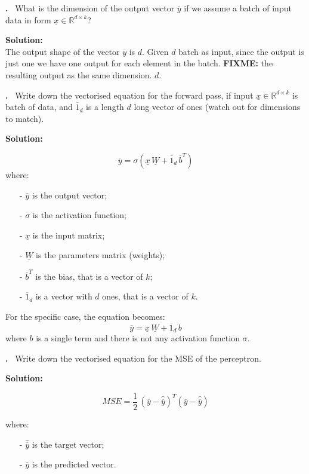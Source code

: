 \documentclass[a4paper,12pt]{article} %
\newcounter{problem}
\newcounter{solution}
\newcommand\Problem{%
	\stepcounter{problem}%
	\textbf{\theproblem.}~%
	\setcounter{solution}{0}%
}
\newcommand\Solution{%
	\textbf{Solution:}\\%
}
\begin{document}
	\Problem{What is the dimension of the output vector $\overline{y}$ if we 
	assume a batch of input data in form $\underline{x} \in \mathbb{R}^{d 
	\times k}$?}\medskip
	
	\Solution{The output shape of the vector $\overline{y}$ is $d$. Given $d$ 
	batch as input, since the output is just one we have one output for each 
	element in the batch. \textbf{FIXME:} the resulting output as the same 
	dimension.
	$d$.}\vspace{0.4cm}
	
	\Problem{Write down the vectorised equation for the forward pass, if input 
	$\underline{x} \in \mathbb{R}^{d \times k}$ is batch of data, and 
	$\overline{1}_d$ is a length $d$ long vector of ones (watch out for 
	dimensions to match).}\medskip
	
	\Solution{
		\begin{equation}
		\overline{y}=\sigma(\underline{x} \, \underline{W}+\overline{1}_d \, 
		\overline{b}^T)
		\end{equation}
		where:
		\begin{itemize}
			\item[-] $\overline{y}$ is the output vector; 
			\item[-] $\sigma$ is the activation function;
			\item[-] $\underline{x}$ is the input matrix;
			\item[-] $\underline{W}$ is the parameters matrix (weights);
			\item[-] $\overline{b}^T$ is the bias, that is a vector of $k$;
			\item[-] $\overline{1}_d$ is a vector  with $d$ ones, that is a 
			vector of $k$.
		\end{itemize}
		For the specific case, the equation becomes:
		\begin{equation}
		\overline{y}=\underline{x} \, \underline{W}+\overline{1}_d \, b
		\end{equation}
		where $b$ is a single term and there is not any activation function 
		$\sigma$.
	}\vspace{0.4cm}
	
	\Problem{Write down the vectorised equation for the MSE of the 
	perceptron.}\medskip
	
	\Solution{	
		\begin{equation}
		MSE = \frac{1}{2} \, 
		(\overline{y}-\hat{\overline{y}})^T(\overline{y}-\hat{\overline{y}})
		\end{equation}
	
		where:
		\begin{itemize}
			\item[-] $\hat{\overline{y}}$ is the target vector; 
			\item[-] ${\overline{y}}$ is the predicted vector.
		\end{itemize}}\vspace{0.4cm}
	
\end{document}
